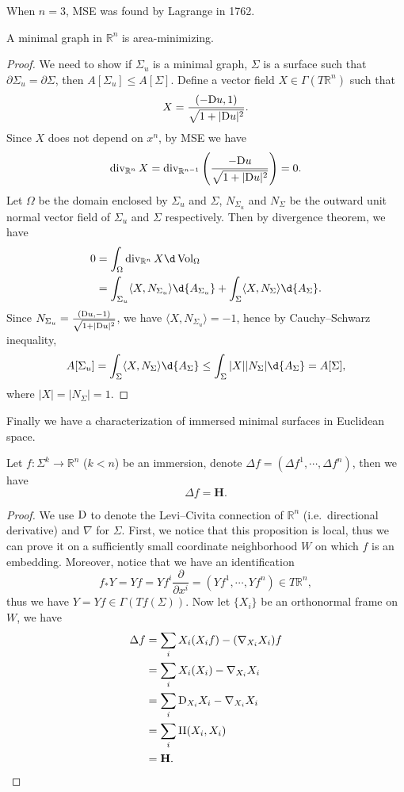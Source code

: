 \begin{rem}
    When $n=3$, MSE was found by Lagrange in 1762.
\end{rem}

\begin{prop}
    A minimal graph in $\mathbb{R}^n$ is area-minimizing.
\end{prop}
\begin{proof}
    We need to show if $\Sigma_u$ is a minimal graph, $\Sigma$ is a surface such that $\partial\Sigma_u=\partial\Sigma$, then $A[\Sigma_u]\leq A[\Sigma]$.
    Define a vector field $X\in\Gamma(T\mathbb{R}^n)$ such that
    \[X=\frac{(-\mathrm{D} u,1)}{\sqrt{1+|\mathrm{D} u|^2}}.\]
    Since $X$ does not depend on $x^n$, by MSE we have
    \[\operatorname{div}_{\mathbb{R}^n}X=\operatorname{div}_{\mathbb{R}^{n-1}}\left(\frac{-\mathrm{D} u}{\sqrt{1+|\mathrm{D} u|^2}}\right)=0.\]
    Let $\Omega$ be the domain enclosed by $\Sigma_u$ and $\Sigma$, $N_{\Sigma_u}$ and $N_\Sigma$ be the outward unit normal vector field of $\Sigma_u$ and $\Sigma$ respectively.
    Then by divergence theorem, we have
    \begin{align*}
        0&=\int_\Omega\div_{\mathbb{R}^n}X\d\Vol_\Omega\\
        &=\int_{\Sigma_u}\langle X,N_{\Sigma_u}\rangle\d{A_{\Sigma_u}}+\int_\Sigma\langle X,N_\Sigma\rangle\d{A_\Sigma}.
    \end{align*}
    Since $N_{\Sigma_u}=\frac{(\mathrm{D} u,-1)}{\sqrt{1+|\mathrm{D} u|^2}}$, we have $\langle X,N_{\Sigma_u}\rangle=-1$, hence by Cauchy--Schwarz inequality,
    \begin{align*}
        A[\Sigma_u]=\int_\Sigma\langle X,N_\Sigma\rangle\d{A_\Sigma}\leq\int_\Sigma|X||N_\Sigma|\d{A_\Sigma}=A[\Sigma],
    \end{align*}
    where $|X|=|N_\Sigma|=1$.
\end{proof}

Finally we have a characterization of immersed minimal surfaces in Euclidean space.
\begin{prop}
    Let $f:\Sigma^k\to\mathbb{R}^n$ ($k<n$) be an immersion, denote $\Delta f=(\Delta f^1,\cdots,\Delta f^n)$, then we have
    \[\Delta f=\mathbf{H}.\]
\end{prop}
\begin{proof}
    We use $\mathrm{D}$ to denote the Levi--Civita connection of $\mathbb{R}^n$ (i.e.\ directional derivative) and $\nabla$ for $\Sigma$.
    First, we notice that this proposition is local, thus we can prove it on a sufficiently small coordinate neighborhood $W$ on which $f$ is an embedding.
    Moreover, notice that we have an identification
    \[f_*Y=Yf=Yf^i\frac{\partial}{\partial{x^i}}=(Yf^1,\cdots,Yf^n)\in T\mathbb{R}^n,\]
    thus we have $Y=Yf\in\Gamma(Tf(\Sigma))$.
    Now let $\{X_i\}$ be an orthonormal frame on $W$, we have
    \begin{align*}
        \Delta f&=\sum_iX_i(X_if)-(\nabla_{X_i}X_i)f\\
        &=\sum_iX_i(X_i)-\nabla_{X_i}X_i\\
        &=\sum_i\mathrm{D}_{X_i}X_i-\nabla_{X_i}X_i\\
        &=\sum_i\operatorname{II}(X_i,X_i)\\
        &=\mathbf{H}.\qedhere
    \end{align*}
\end{proof}

